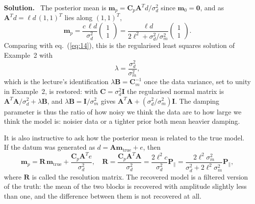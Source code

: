\documentclass[a4paper,12pt]{paper}
\newenvironment{solution}{\par\noindent\textbf{Solution.}\ }{\par\medskip}
\begin{document}
\begin{solution}
The posterior mean is $\mathbf{m}_{p} = \mathbf{C}_{p}\mathbf{A}^{T}d/\sigma_{d}^{2}$ since $\mathbf{m}_{0}=\mathbf{0}$,
and as $\mathbf{A}^{T}d = \ell d\,(1,1)^{T}$ lies along $(1,1)^{T}$,
\begin{equation}
    \mathbf{m}_{p} = \frac{c\,\ell d}{\sigma_{d}^{2}}\begin{pmatrix} 1 \\ 1 \end{pmatrix}
    = \frac{\ell d}{2\ell^{2}+\sigma_{d}^{2}/\sigma_{m}^{2}}\begin{pmatrix} 1 \\ 1 \end{pmatrix}.
    \label{eq:30}
\end{equation}
Comparing with eq.~(\ref{eq:14}), this is the regularised least squares solution of Example~2 with
\begin{equation}
    \lambda = \frac{\sigma_{d}^{2}}{\sigma_{m}^{2}},
    \label{eq:31}
\end{equation}
which is the lecture's identification $\lambda\mathbf{B}=\mathbf{C}_{m}^{-1}$ once the data variance,
set to unity in Example~2, is restored: with $\mathbf{C}=\sigma_{d}^{2}\mathbf{I}$ the regularised
normal matrix is $\mathbf{A}^{T}\mathbf{A}/\sigma_{d}^{2}+\lambda\mathbf{B}$, and
$\lambda\mathbf{B}=\mathbf{I}/\sigma_{m}^{2}$ gives $\mathbf{A}^{T}\mathbf{A}+(\sigma_{d}^{2}/\sigma_{m}^{2})\mathbf{I}$.
The damping parameter is thus the ratio of how noisy we think the data are to how large we think the
model is: noisier data or a tighter prior both mean heavier damping.

It is also instructive to ask how the posterior mean is related to the true model. If the datum
was generated as $d = \mathbf{A}\mathbf{m}_{\mathrm{true}}+e$, then
\begin{equation}
    \mathbf{m}_{p} = \mathbf{R}\,\mathbf{m}_{\mathrm{true}} + \frac{\mathbf{C}_{p}\mathbf{A}^{T}e}{\sigma_{d}^{2}},\quad
    \mathbf{R} = \frac{\mathbf{C}_{p}\mathbf{A}^{T}\mathbf{A}}{\sigma_{d}^{2}}
    = \frac{2\ell^{2}c}{\sigma_{d}^{2}}\mathbf{P}_{\parallel}
    = \frac{2\ell^{2}\sigma_{m}^{2}}{\sigma_{d}^{2}+2\ell^{2}\sigma_{m}^{2}}\mathbf{P}_{\parallel},
    \label{eq:32}
\end{equation}
where $\mathbf{R}$ is called the resolution matrix. The recovered model is a filtered version of the
truth: the mean of the two blocks is recovered with amplitude slightly less than one, and the
difference between them is not recovered at all.


\end{solution}
\end{document}
